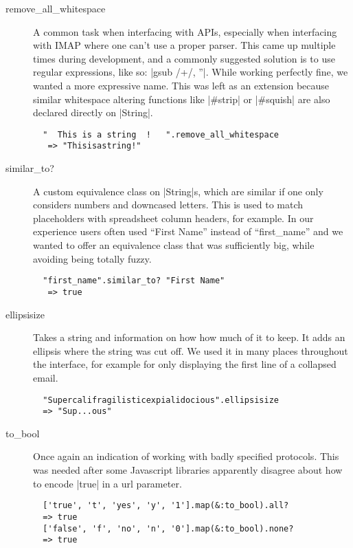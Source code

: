 \begin{description}

\item[remove\_all\_whitespace] A common task when interfacing with APIs, especially when interfacing with IMAP where one can't use a proper parser. This came up multiple times during development, and a commonly suggested solution is to use regular expressions, like so: |gsub /\s+/, ''|. While working perfectly fine, we wanted a more expressive name. This was left as an extension because similar whitespace altering functions like |#strip| or  |#squish| are also declared directly on |String|.
\\
\begin{lstlisting}
  "  This is a string  !   ".remove_all_whitespace
   => "Thisisastring!"
\end{lstlisting}

\item[similar\_to?] A custom equivalence class on |String|s, which are similar if one only considers numbers and downcased letters. This is used to match placeholders with spreadsheet column headers, for example.
In our experience users often used ``First Name'' instead of ``first\_name'' and we wanted to offer an equivalence class that was sufficiently big, while avoiding being totally fuzzy.
\\
\begin{lstlisting}
  "first_name".similar_to? "First Name"
   => true
\end{lstlisting}

\item[ellipsisize] Takes a string and information on how how much of it to keep. It adds an ellipsis where the string was cut off. We used it in many places throughout the interface, for example for only displaying the first line of a collapsed email.
\\
\begin{lstlisting}
  "Supercalifragilisticexpialidocious".ellipsisize
  => "Sup...ous"
\end{lstlisting}


\item[to\_bool] Once again an indication of working with badly specified protocols. This was needed after some Javascript libraries apparently disagree about how to encode |true| in a \gls{url} parameter.
\\
\begin{lstlisting}
  ['true', 't', 'yes', 'y', '1'].map(&:to_bool).all?
  => true
  ['false', 'f', 'no', 'n', '0'].map(&:to_bool).none?
  => true
\end{lstlisting}

\end{description}

